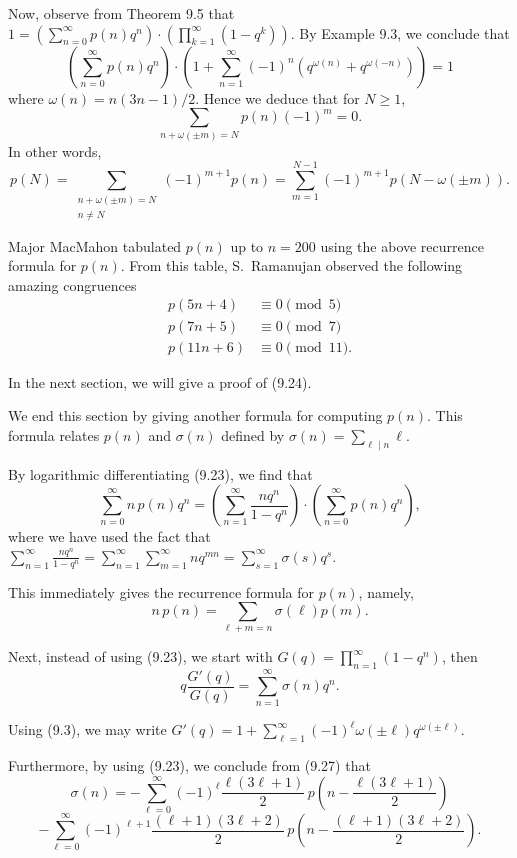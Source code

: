 \documentclass{article}
\begin{document}
Now, observe from Theorem 9.5 that
$1 = \left(\sum_{n=0}^{\infty} p(n) q^n\right) \cdot \left(\prod_{k=1}^{\infty}(1-q^k)\right)$.
By Example 9.3, we conclude that
\[
\left(\sum_{n=0}^{\infty} p(n) q^n\right) \cdot \left(1 + \sum_{n=1}^{\infty}(-1)^n(q^{\omega(n)} + q^{\omega(-n)})\right) = 1
\]
where $\omega(n) = n(3n-1)/2$. Hence we deduce that for $N \geq 1$,
\[
\sum_{n+\omega(\pm m)=N} p(n)(-1)^m = 0.
\]
In other words,
\[
p(N) = \sum_{\substack{n+\omega(\pm m)=N \\ n \neq N}} (-1)^{m+1} p(n) = \sum_{m=1}^{N-1}(-1)^{m+1} p(N - \omega(\pm m)).
\]

Major MacMahon tabulated $p(n)$ up to $n = 200$ using the above recurrence
formula for $p(n)$. From this table, S.\ Ramanujan observed the following amazing
congruences
\begin{align}
p(5n+4) &\equiv 0 \pmod{5} \tag{9.24} \\
p(7n+5) &\equiv 0 \pmod{7} \tag{9.25} \\
p(11n+6) &\equiv 0 \pmod{11}. \tag{9.26}
\end{align}

In the next section, we will give a proof of (9.24).

We end this section by giving another formula for computing $p(n)$. This formula
relates $p(n)$ and $\sigma(n)$ defined by $\sigma(n) = \sum_{\ell \mid n} \ell$.

By logarithmic differentiating (9.23), we find that
\[
\sum_{n=0}^{\infty} n\, p(n) q^n = \left(\sum_{n=1}^{\infty} \frac{nq^n}{1-q^n}\right) \cdot \left(\sum_{n=0}^{\infty} p(n) q^n\right),
\]
where we have used the fact that
$\sum_{n=1}^{\infty} \frac{nq^n}{1-q^n} = \sum_{n=1}^{\infty}\sum_{m=1}^{\infty} nq^{mn} = \sum_{s=1}^{\infty}\sigma(s) q^s$.

This immediately gives the recurrence formula for $p(n)$, namely,
\[
n\, p(n) = \sum_{\ell + m = n} \sigma(\ell) p(m).
\]

Next, instead of using (9.23), we start with
$G(q) = \prod_{n=1}^{\infty}(1-q^n)$,
then
\begin{equation}
q\frac{G'(q)}{G(q)} = \sum_{n=1}^{\infty}\sigma(n) q^n.
\tag{9.27}
\end{equation}

Using (9.3), we may write
$G'(q) = 1 + \sum_{\ell=1}^{\infty}(-1)^\ell \omega(\pm\ell) q^{\omega(\pm\ell)}$.

Furthermore, by using (9.23), we conclude from (9.27) that
\begin{equation}
\sigma(n) = -\sum_{\ell=0}^{\infty}(-1)^\ell \frac{\ell(3\ell+1)}{2}\, p\!\left(n - \frac{\ell(3\ell+1)}{2}\right)
\tag{9.28}
\end{equation}
\[
- \sum_{\ell=0}^{\infty}(-1)^{\ell+1}\frac{(\ell+1)(3\ell+2)}{2}\, p\!\left(n - \frac{(\ell+1)(3\ell+2)}{2}\right).
\]
\end{document}
